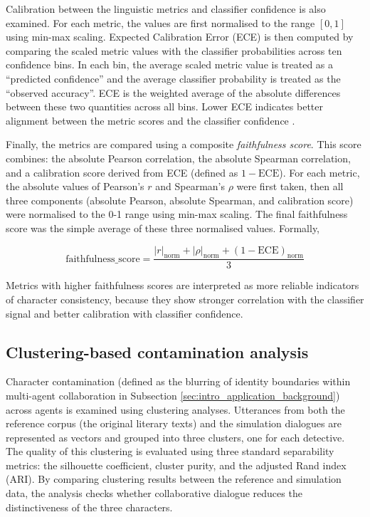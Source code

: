 \documentclass{article}
\begin{document}
Calibration between the linguistic metrics and classifier confidence is also examined. For each metric, the values are first normalised to the range $[0,1]$ using min-max scaling. Expected Calibration Error (ECE) is then computed by comparing the scaled metric values with the classifier probabilities across ten confidence bins. In each bin, the average scaled metric value is treated as a “predicted confidence” and the average classifier probability is treated as the “observed accuracy”. ECE is the weighted average of the absolute differences between these two quantities across all bins. Lower ECE indicates better alignment between the metric scores and the classifier confidence \citep{raj2025ece}.

Finally, the metrics are compared using a composite \emph{faithfulness score}. This score combines: the absolute Pearson correlation, the absolute Spearman correlation, and a calibration score derived from ECE (defined as $1 - \text{ECE}$). For each metric, the absolute values of Pearson's $r$ and Spearman's $\rho$ were first taken, then all three components (absolute Pearson, absolute Spearman, and calibration score) were normalised to the 0-1 range using min-max scaling. The final faithfulness score was the simple average of these three normalised values. Formally,

\begin{equation}
\text{faithfulness\_score} = \frac{ |r|_{\text{norm}} + |\rho|_{\text{norm}} + (1 - \text{ECE})_{\text{norm}} }{3}
\end{equation}

Metrics with higher faithfulness scores are interpreted as more reliable indicators of character consistency, because they show stronger correlation with the classifier signal and better calibration with classifier confidence.

\subsection{Clustering-based contamination analysis} \label{sec:eval_clustering}

Character contamination (defined as the blurring of identity boundaries within multi-agent collaboration in Subsection \ref{sec:intro_application_background}) across agents is examined using clustering analyses. Utterances from both the reference corpus (the original literary texts) and the simulation dialogues are represented as vectors and grouped into three clusters, one for each detective. The quality of this clustering is evaluated using three standard separability metrics: the silhouette coefficient, cluster purity, and the adjusted Rand index (ARI). By comparing clustering results between the reference and simulation data, the analysis checks whether collaborative dialogue reduces the distinctiveness of the three characters.
\end{document}
